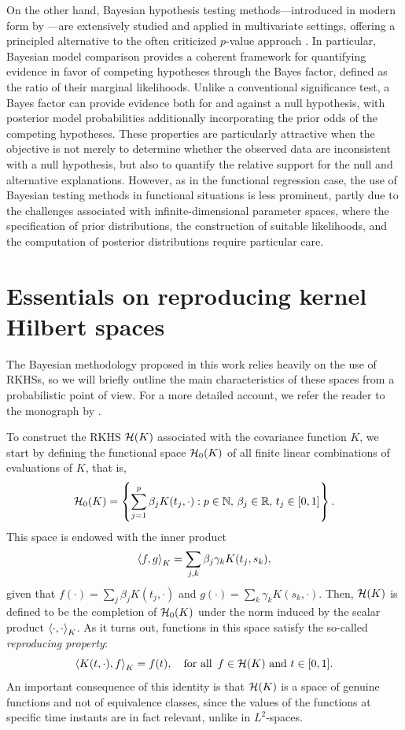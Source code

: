 On the other hand, Bayesian hypothesis testing methods---introduced in modern form by \citet{jeffreys1961theory}---are extensively studied and applied in multivariate settings, offering a principled alternative to the often criticized \(p\)-value approach \citep[see][and references therein]{robert2007bayesian, robert202250}. In particular, Bayesian model comparison provides a coherent framework for quantifying evidence in favor of competing hypotheses through the Bayes factor, defined as the ratio of their marginal likelihoods. Unlike a conventional significance test, a Bayes factor can provide evidence both for and against a null hypothesis, with posterior model probabilities additionally incorporating the prior odds of the competing hypotheses. These properties are particularly attractive when the objective is not merely to determine whether the observed data are inconsistent with a null hypothesis, but also to quantify the relative support for the null and alternative explanations. However, as in the functional regression case, the use of Bayesian testing methods in functional situations is less prominent, partly due to the challenges associated with infinite-dimensional parameter spaces, where the specification of prior distributions, the construction of suitable likelihoods, and the computation of posterior distributions require particular care.

\section{Essentials on reproducing kernel Hilbert spaces}

The Bayesian methodology proposed in this work relies heavily on the use of \acs{RKHSs}, so we will briefly outline the main characteristics of these spaces from a probabilistic point of view. For a more detailed account, we refer the reader to the monograph by \citet{berlinet2004reproducing}. 

To construct the \acs{RKHS} \(\mathcal{H}(K)\) associated with the covariance function \(K\), we start by defining the functional space \(\mathcal{H}_0(K)\) of all finite linear combinations of evaluations of \(K\), that is,
\begin{equation}\label{eq:h0}
  \mathcal{H}_0(K) = \left\{ \sum_{j=1}^p \beta_j K(t_j, \cdot): p \in \mathbb{N},\, \beta_j \in \mathbb{R},\, t_j \in [0, 1] \right\}.
\end{equation}
This space is endowed with the inner product 
\[
  \left\langle f,g\right\rangle_K = \sum_{j, k} \beta_j \gamma_k K(t_j, s_k),
\]
given that \(f(\cdot)=\sum_j \beta_j K(t_j, \cdot) \) and \(g(\cdot)=\sum_k \gamma_k K(s_k, \cdot)\). Then, \(\mathcal{H}(K)\) is defined to be the completion of \(\mathcal{H}_0(K)\) under the norm induced by the scalar product \(\left\langle\cdot,\cdot\right\rangle_K\). As it turns out, functions in this space satisfy the so-called \textit{reproducing property}: 
\[
  \left\langle K(t, \cdot),f\right\rangle_K = f(t),\quad \text{for all }\, f \in \mathcal{H}(K) \text{ and } t \in [0, 1].
\]
An important consequence of this identity is that \(\mathcal{H}(K)\) is a space of genuine functions and not of equivalence classes, since the values of the functions at specific time instants are in fact relevant, unlike in \(L^2\)-spaces.

